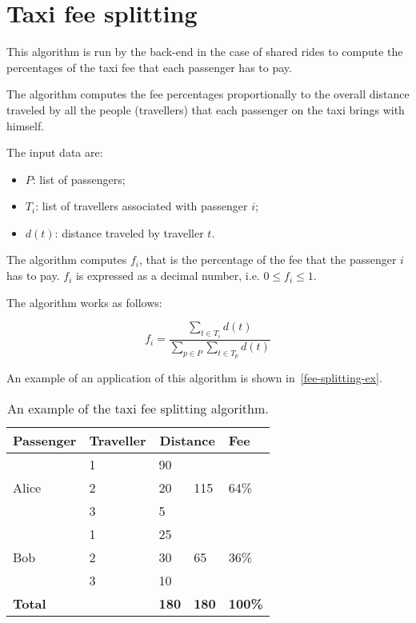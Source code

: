 \section{Taxi fee splitting}
\label{sec:taxi-fee-splitting}
This algorithm is run by the back-end in the case of shared rides to compute the percentages of the taxi fee that each passenger has to pay.

The algorithm computes the fee percentages proportionally to the overall distance traveled by all the people (travellers) that each passenger on the taxi brings with himself.

The input data are:
\begin{itemize}
    \item $P$: list of passengers;
    \item $T_i$: list of travellers associated with passenger $i$;
    \item $d(t)$: distance traveled by traveller $t$.
\end{itemize}

The algorithm computes $f_i$, that is the percentage of the fee that the passenger $i$ has to pay.
$f_i$ is expressed as a decimal number, i.e. $0 \le f_i \le 1$.

The algorithm works as follows:

\begin{equation}
    f_i = \dfrac
        {\displaystyle \sum_{t \in T_i} d(t)}
        {\displaystyle \sum_{p \in P} \sum_{t \in T_p} d(t)}
\end{equation}

An example of an application of this algorithm is shown in~\autoref{fee-splitting-ex}.

\begin{table}
\begin{center}
\begin{tabular}{ l  l  l  l  l }
    \hline
    \textbf{Passenger} & \textbf{Traveller} & \multicolumn{2}{c}{\textbf{Distance}} & \textbf{Fee} \\
    \hline
    \multirow{3}{*}{Alice} & 1 & 90 & \multirow{3}{*}{115} & \multirow{3}{*}{64\%} \\
    & 2 & 20 & & \\
    & 3 & 5 & & \\
    \hline
    \multirow{3}{*}{Bob} & 1 & 25 & \multirow{3}{*}{65} & \multirow{3}{*}{36\%} \\
    & 2 & 30 & & \\
    & 3 & 10 & & \\
    \hline
    \textbf{Total} & & \textbf{180} & \textbf{180} & \textbf{100\%} \\
    \hline
\end{tabular}
\caption{An example of the taxi fee splitting algorithm.}
\label{fee-splitting-ex}
\end{center}
\end{table}
